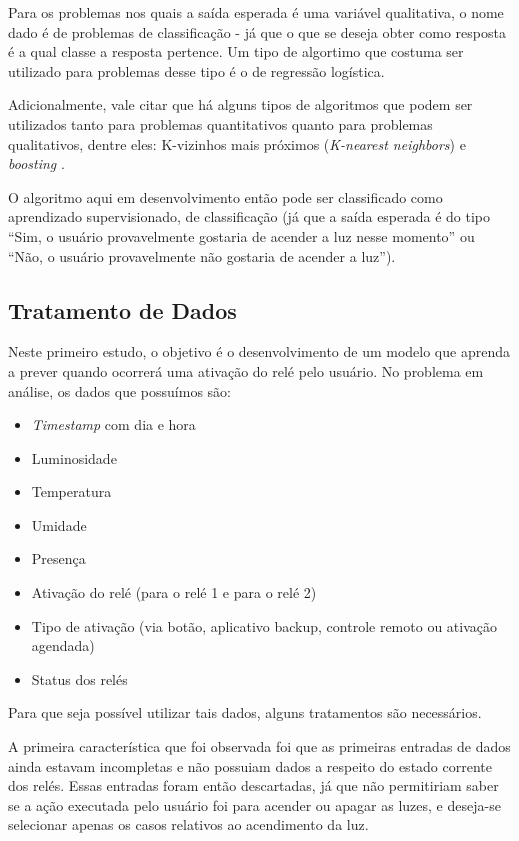 			Para os problemas nos quais a saída esperada é uma variável qualitativa, o nome dado é de problemas de classificação - já que o que se deseja obter como resposta é a qual classe a resposta pertence. Um tipo de algortimo que costuma ser utilizado para problemas desse tipo é o de regressão logística.

			Adicionalmente, vale citar que há alguns tipos de algoritmos que podem ser utilizados tanto para problemas quantitativos quanto para problemas qualitativos, dentre eles: K-vizinhos mais próximos (\emph{K-nearest neighbors}) e \emph{boosting} \cite{islr}.

			O algoritmo aqui em desenvolvimento então pode ser classificado como aprendizado supervisionado, de classificação (já que a saída esperada é do tipo ``Sim, o usuário provavelmente gostaria de acender a luz nesse momento'' ou ``Não, o usuário provavelmente não gostaria de acender a luz'').

		\subsection{Tratamento de Dados}
			
			Neste primeiro estudo, o objetivo é o desenvolvimento de um modelo que aprenda a prever quando ocorrerá uma ativação do relé pelo usuário. No problema em análise, os dados que possuímos são:

			\begin{itemize}
				\item \emph{Timestamp} com dia e hora
				\item Luminosidade
				\item Temperatura
				\item Umidade
				\item Presença
				\item Ativação do relé (para o relé 1 e para o relé 2)
				\item Tipo de ativação (via botão, aplicativo backup, controle remoto ou ativação agendada)
				\item Status dos relés
			\end{itemize}

			Para que seja possível utilizar tais dados, alguns tratamentos são necessários.

			A primeira característica que foi observada foi que as primeiras entradas de dados ainda estavam incompletas e não possuiam dados a respeito do estado corrente dos relés. Essas entradas foram então descartadas, já que não permitiriam saber se a ação executada pelo usuário foi para acender ou apagar as luzes, e deseja-se selecionar apenas os casos relativos ao acendimento da luz.

